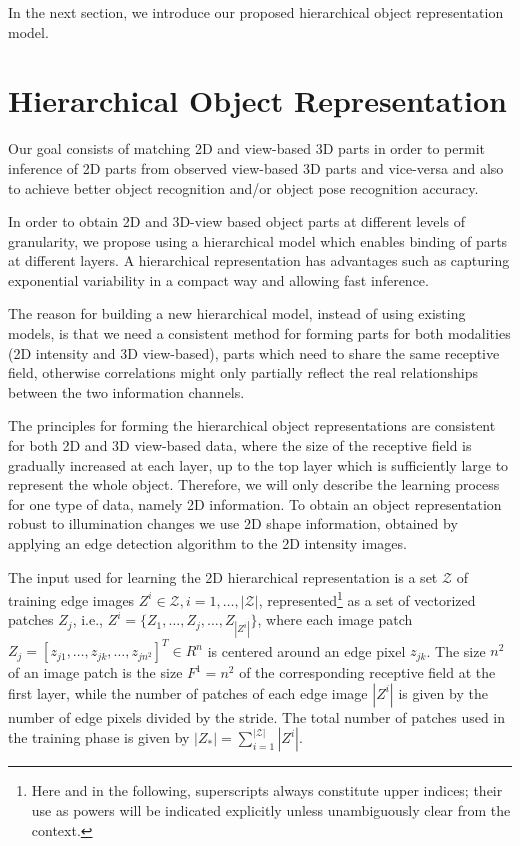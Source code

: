 \documentclass[runningheads]{llncs}
\begin{document}
In the next section, we introduce our proposed hierarchical object representation model.  

\section{Hierarchical Object Representation} 
\label{sec:learning}    

Our goal consists of matching 2D and view-based 3D parts in order to permit inference of 2D parts from observed view-based 3D parts and vice-versa and also to achieve better object recognition and/or object pose recognition accuracy.  

In order to obtain 2D and 3D-view based object parts at different levels of granularity, we propose using a hierarchical model which enables binding of parts at different layers. A hierarchical representation has advantages such as capturing exponential variability in a compact way and allowing fast inference.

The reason for building a new hierarchical model, instead of using existing models, is that we need a consistent method for forming parts for both modalities (2D intensity and 3D view-based), parts which need to share the same receptive field, otherwise correlations might only partially reflect the real relationships between the two information channels.

The principles for forming the hierarchical object representations are consistent for both 2D and 3D view-based data, where the size of the receptive field is gradually increased at each layer, up to the top layer which is sufficiently large to represent the whole object. Therefore, we will only describe the learning process for one type of data, namely 2D information. To obtain an object representation robust to illumination changes we use 2D shape information, obtained by applying an edge detection algorithm to the 2D intensity images.

The input used for learning the 2D hierarchical representation is a set $\mathcal{Z}$ of training edge images $Z^i \in \mathcal{Z}, i=1,\ldots,|\mathcal{Z}|$, represented\footnote{Here and in the following, superscripts always constitute upper indices; their use as powers will be indicated explicitly unless unambiguously clear from the context.} as a set of vectorized patches $Z_j$, i.e., $Z^i=\{Z_1,\ldots,Z_j,\ldots,Z_{|Z^i|}\}$, where each image patch
$Z_j=[z_{j1},\ldots,z_{jk},\ldots,z_{jn^2}]^T \in R^n$ is centered around an edge pixel $z_{jk}$. The size $n^2$ of an image patch is the size $F^1=n^2$ of the corresponding receptive field at the first layer, while the number of patches of each edge image $|Z^i|$ is given by the number of edge pixels divided by the stride. The total number of patches used in the training phase is given by $|Z_*|=\sum_{i=1}^{|\mathcal{Z}|} |Z^i|$.
\end{document}
